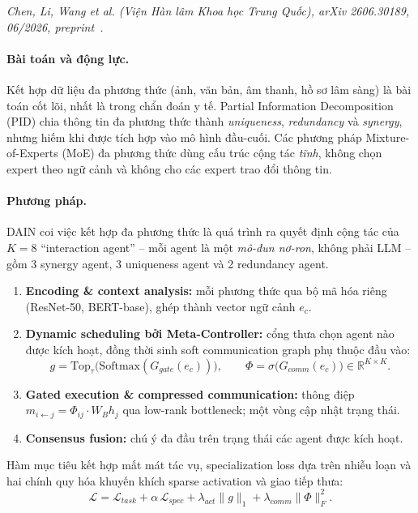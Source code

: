 \noindent\textit{Chen, Li, Wang et al. (Viện Hàn lâm Khoa học Trung Quốc), arXiv 2606.30189, 06/2026, preprint~\cite{p7dain}.}

\paragraph{Bài toán và động lực.} Kết hợp dữ liệu đa phương thức (ảnh, văn bản, âm thanh, hồ sơ lâm sàng) là bài toán cốt lõi, nhất là trong chẩn đoán y tế. Partial Information Decomposition (PID) chia thông tin đa phương thức thành \emph{uniqueness}, \emph{redundancy} và \emph{synergy}, nhưng hiếm khi được tích hợp vào mô hình đầu-cuối. Các phương pháp Mixture-of-Experts (MoE) đa phương thức dùng cấu trúc cộng tác \emph{tĩnh}, không chọn expert theo ngữ cảnh và không cho các expert trao đổi thông tin.

\paragraph{Phương pháp.} DAIN coi việc kết hợp đa phương thức là quá trình ra quyết định cộng tác của $K=8$ ``interaction agent'' -- mỗi agent là một \emph{mô-đun nơ-ron}, không phải LLM -- gồm 3 synergy agent, 3 uniqueness agent và 2 redundancy agent.
\begin{enumerate}
  \item \textbf{Encoding \& context analysis:} mỗi phương thức qua bộ mã hóa riêng (ResNet-50, BERT-base), ghép thành vector ngữ cảnh $e_c$.
  \item \textbf{Dynamic scheduling bởi Meta-Controller:} cổng thưa chọn agent nào được kích hoạt, đồng thời sinh soft communication graph phụ thuộc đầu vào:
  \begin{equation}
    g = \mathrm{Top}_\tau\big(\mathrm{Softmax}(G_{gate}(e_c))\big),\qquad \Phi = \sigma\big(G_{comm}(e_c)\big)\in\mathbb{R}^{K\times K}.
  \end{equation}
  \item \textbf{Gated execution \& compressed communication:} thông điệp $m_{i\leftarrow j} = \Phi_{ij}\cdot W_B h_j$ qua low-rank bottleneck; một vòng cập nhật trạng thái.
  \item \textbf{Consensus fusion:} chú ý đa đầu trên trạng thái các agent được kích hoạt.
\end{enumerate}
Hàm mục tiêu kết hợp mất mát tác vụ, specialization loss dựa trên nhiễu loạn và hai chính quy hóa khuyến khích sparse activation và giao tiếp thưa:
\begin{equation}
  \mathcal L = \mathcal L_{task} + \alpha\,\mathcal L_{spec} + \lambda_{act}\|g\|_1 + \lambda_{comm}\|\Phi\|_F^2.
\end{equation}

